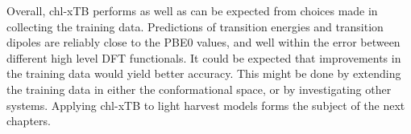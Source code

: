 Overall, chl-xTB performs as well as can be expected from choices made in collecting
the training data. Predictions of transition energies and transition dipoles are
reliably close to the PBE0 values, and well within the error between different high 
level DFT functionals. It could be expected that improvements in the training data 
would yield better accuracy. This might be done by extending the training data in 
either the conformational space, or by investigating other systems. Applying chl-xTB 
to light harvest models forms the subject of the next chapters.

